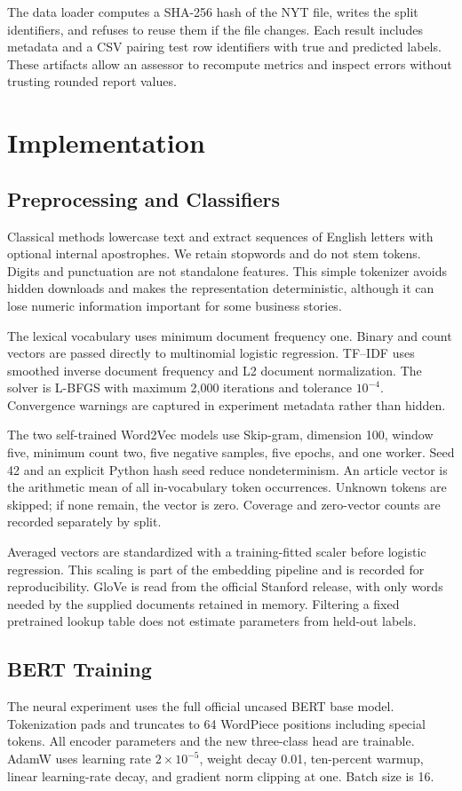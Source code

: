 \documentclass[11pt]{article}
\begin{document}
The data loader computes a SHA-256 hash of the NYT file, writes the split identifiers, and refuses to reuse them if the file changes. Each result includes metadata and a CSV pairing test row identifiers with true and predicted labels. These artifacts allow an assessor to recompute metrics and inspect errors without trusting rounded report values.
\clearpage
\section{Implementation}
\subsection{Preprocessing and Classifiers}
Classical methods lowercase text and extract sequences of English letters with optional internal apostrophes. We retain stopwords and do not stem tokens. Digits and punctuation are not standalone features. This simple tokenizer avoids hidden downloads and makes the representation deterministic, although it can lose numeric information important for some business stories.

The lexical vocabulary uses minimum document frequency one. Binary and count vectors are passed directly to multinomial logistic regression. TF--IDF uses smoothed inverse document frequency and L2 document normalization. The solver is L-BFGS with maximum 2,000 iterations and tolerance $10^{-4}$. Convergence warnings are captured in experiment metadata rather than hidden.

The two self-trained Word2Vec models use Skip-gram, dimension 100, window five, minimum count two, five negative samples, five epochs, and one worker. Seed 42 and an explicit Python hash seed reduce nondeterminism. An article vector is the arithmetic mean of all in-vocabulary token occurrences. Unknown tokens are skipped; if none remain, the vector is zero. Coverage and zero-vector counts are recorded separately by split.

Averaged vectors are standardized with a training-fitted scaler before logistic regression. This scaling is part of the embedding pipeline and is recorded for reproducibility. GloVe is read from the official Stanford release, with only words needed by the supplied documents retained in memory. Filtering a fixed pretrained lookup table does not estimate parameters from held-out labels.

\subsection{BERT Training}
The neural experiment uses the full official uncased BERT base model. Tokenization pads and truncates to 64 WordPiece positions including special tokens. All encoder parameters and the new three-class head are trainable. AdamW uses learning rate $2\times10^{-5}$, weight decay 0.01, ten-percent warmup, linear learning-rate decay, and gradient norm clipping at one. Batch size is 16.
\end{document}
